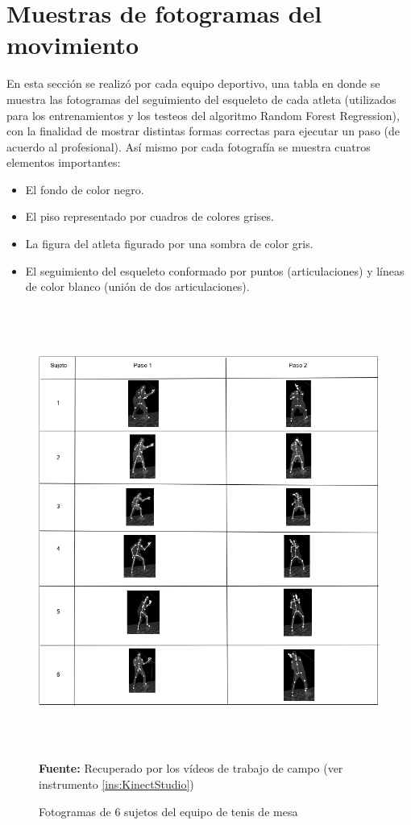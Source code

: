 \section{Muestras de fotogramas del movimiento} \label{res:fotogramas}
En esta secci\'on se realiz\'o por cada equipo deportivo, una tabla en donde se muestra las  fotogramas del seguimiento del  esqueleto de cada atleta (utilizados para los entrenamientos y los testeos del algoritmo Random Forest Regression), con la finalidad de mostrar distintas formas correctas para ejecutar un paso (de acuerdo al profesional). As\'i mismo por cada fotograf\'ia se muestra cuatros elementos importantes:
\begin{itemize}
\item El fondo de color negro.
\item El piso representado por cuadros de colores grises.
\item La figura del atleta figurado por una sombra de color gris.
\item El seguimiento del esqueleto conformado por puntos (articulaciones) y l\'ineas de color blanco (uni\'on de dos articulaciones).
\end{itemize}
\begin{figure}[H]
	\caption{Fotogramas de 6 sujetos del equipo de tenis de mesa}
	\label{fig:fotogramaTenis}
	\centering
	\includegraphics[width=445px,height=560px]{graphics/resultados/SETenisDeMesa.PNG} \\
	\textbf{Fuente:} Recuperado por los v\'ideos de trabajo de campo (ver instrumento \ref{ins:KinectStudio})
\end{figure}
